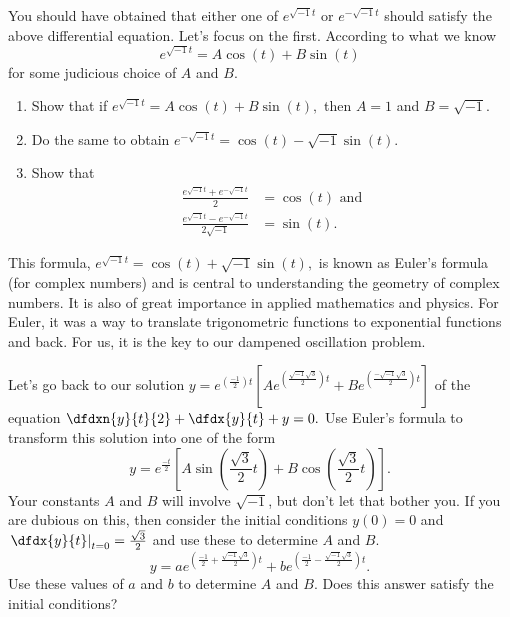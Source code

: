 You should have obtained that either one of $e^{\sqrt{-1}t}$ or $e^{-\sqrt{-1}t}$
should satisfy the above differential equation.  Let's focus on the
first.  According to what we know
$$
e^{\sqrt{-1}t}=A\cos(t)+B\sin(t)
$$
for some judicious choice of $A$ and $B.$

\begin{embeddedproblem}{}
  \begin{enumerate}[label={\bf{}(\alph*)}]{}
  \item Show that if $e^{\sqrt{-1}t}=A\cos(t)+B\sin(t),$ then $A=1$ and $B=\sqrt{-1}.$
  \item Do the same to obtain $e^{-\sqrt{-1}t}=\cos(t)-\sqrt{-1}\sin(t).$
  \item Show that
    \begin{align*}
      \frac{e^{\sqrt{-1}t}+e^{-\sqrt{-1}t}}{2} &= \cos(t) \text{ and} \\
      \frac{e^{\sqrt{-1}t}-e^{-\sqrt{-1}t}}{2\sqrt{-1}}&= \sin(t).
    \end{align*}
  \end{enumerate}
\end{embeddedproblem}

This formula, $e^{\sqrt{-1}t}=\cos(t)+ \sqrt{-1}\sin(t),$ is known as Euler's formula
(for complex numbers) and is central to understanding the geometry of
complex numbers.  It is also of great importance in applied
mathematics and physics.  For Euler, it was a way to translate
trigonometric functions to exponential functions and back.  For us, it
is the key to our dampened oscillation problem.

\begin{embeddedproblem}{}
  Let's go back to our solution
  $y=
  e^{\left(\frac{-1}{2}\right)t}\left[Ae^{\left(\frac{\sqrt{-1}\sqrt{3}}{2}\right)t}+Be^{\left(\frac{-\sqrt{-1}\sqrt{3}}{2}\right)t}\right]$
  of the equation $\dfdxn{y}{t}{2}+\dfdx{y}{t}+y=0.$ Use Euler's
  formula to transform this solution into one of the form
  $$y=e^{\frac{-t}{2}} \left[
    A\sin\left(\frac{\sqrt{3}}{2}t\right)+B\cos\left(\frac{\sqrt{3}}{2}t\right)
  \right].$$ Your constants $A$ and $B$ will involve $\sqrt{-1}$, but don't let
  that bother you.  If you are dubious on this, then consider the
  initial conditions $y(0)=0$ and
  $\left.\dfdx{y}{t}\right|_{t=0}=\frac{\sqrt{3}}{2}$ and use these to
  determine $A$ and $B$.
  $$
  y=ae^{
    \left(
      \frac{-1}{2}+\frac{\sqrt{-1}\sqrt{3}}{2}
    \right)t
  }+be^{
    \left(
      \frac{-1}{2}-\frac{\sqrt{-1}\sqrt{3}}{2}
    \right)t
  }.
  $$
  Use these values of $a$ and $b$ to determine $A$ and $B.$ Does this
  answer satisfy the initial conditions?
\end{embeddedproblem}


